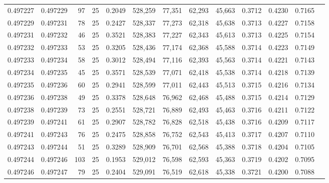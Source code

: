 \begin{tabular}{rrrrrrrrrrrrr}
0.497227 & 0.497229 &    97 &  25 &                                     0.2049 & 528,259 &  77,351 &  62,293 &  45,663 & 0.3712 & 0.4230 & 0.7165 \\
0.497229 & 0.497231 &    78 &  25 &                                     0.2427 & 528,337 &  77,273 &  62,318 &  45,638 & 0.3713 & 0.4227 & 0.7158 \\
0.497231 & 0.497232 &    46 &  25 &                                     0.3521 & 528,383 &  77,227 &  62,343 &  45,613 & 0.3713 & 0.4225 & 0.7154 \\
0.497232 & 0.497233 &    53 &  25 &                                     0.3205 & 528,436 &  77,174 &  62,368 &  45,588 & 0.3714 & 0.4223 & 0.7149 \\
0.497233 & 0.497234 &    58 &  25 &                                     0.3012 & 528,494 &  77,116 &  62,393 &  45,563 & 0.3714 & 0.4221 & 0.7143 \\
0.497234 & 0.497235 &    45 &  25 &                                     0.3571 & 528,539 &  77,071 &  62,418 &  45,538 & 0.3714 & 0.4218 & 0.7139 \\
0.497235 & 0.497236 &    60 &  25 &                                     0.2941 & 528,599 &  77,011 &  62,443 &  45,513 & 0.3715 & 0.4216 & 0.7134 \\
0.497236 & 0.497238 &    49 &  25 &                                     0.3378 & 528,648 &  76,962 &  62,468 &  45,488 & 0.3715 & 0.4214 & 0.7129 \\
0.497238 & 0.497239 &    73 &  25 &                                     0.2551 & 528,721 &  76,889 &  62,493 &  45,463 & 0.3716 & 0.4211 & 0.7122 \\
0.497239 & 0.497241 &    61 &  25 &                                     0.2907 & 528,782 &  76,828 &  62,518 &  45,438 & 0.3716 & 0.4209 & 0.7117 \\
0.497241 & 0.497243 &    76 &  25 &                                     0.2475 & 528,858 &  76,752 &  62,543 &  45,413 & 0.3717 & 0.4207 & 0.7110 \\
0.497243 & 0.497244 &    51 &  25 &                                     0.3289 & 528,909 &  76,701 &  62,568 &  45,388 & 0.3718 & 0.4204 & 0.7105 \\
0.497244 & 0.497246 &   103 &  25 &                                     0.1953 & 529,012 &  76,598 &  62,593 &  45,363 & 0.3719 & 0.4202 & 0.7095 \\
0.497246 & 0.497247 &    79 &  25 &                                     0.2404 & 529,091 &  76,519 &  62,618 &  45,338 & 0.3721 & 0.4200 & 0.7088 \\

\end{tabular}
